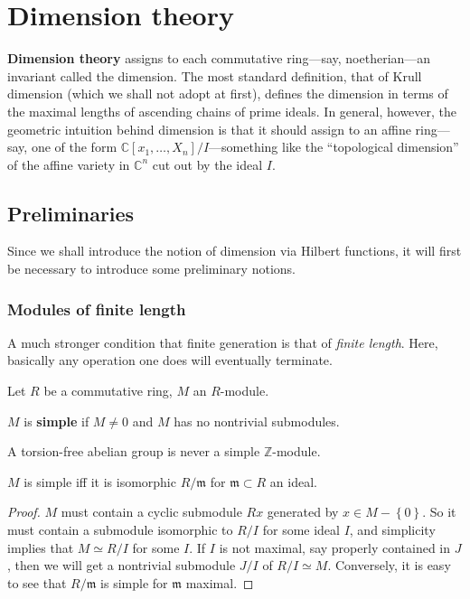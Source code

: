 \chapter{Dimension theory}

\textbf{Dimension theory} assigns to each commutative ring---say,
noetherian---an invariant called the dimension. The most standard definition,
that of Krull dimension (which we shall not adopt at first), defines the
dimension in terms of the maximal lengths of ascending chains of prime ideals. 
In general, however, the geometric intuition behind dimension is that it
should assign to an affine ring---say, one of the form $\mathbb{C}[x_1, \dots,
X_n]/I$---something like the ``topological dimension'' of the affine variety
in $\mathbb{C}^n$ cut out by the ideal $I$. 

\section{Preliminaries}

Since we shall introduce the notion of dimension via Hilbert functions, it
will first be necessary to introduce some preliminary notions.

\subsection{Modules of finite length}

A much stronger condition that finite generation is that of \emph{finite
length}. Here, basically any operation one does will eventually terminate. 

Let $R$ be a commutative ring, $M$ an $R$-module. 

\begin{definition} 
$M$ is \textbf{simple} if $M \neq 0$ and $M$ has no nontrivial submodules.
\end{definition} 


\begin{exercise} 
A torsion-free abelian group is never a simple $\mathbb{Z}$-module.
\end{exercise} 

\begin{proposition} 
$M$ is simple iff it is isomorphic $R/\mathfrak{m}$ for $\mathfrak{m} \subset
R$ an ideal.
\end{proposition} 

\begin{proof} 
$M$ must contain a cyclic submodule $Rx$ generated by $x \in
M - \left\{0\right\}$. So it must contain a submodule isomorphic to $R/I$
for some ideal $I$, and
simplicity implies that $M \simeq R/I$ for some $I$. If $I$ is not maximal,
say properly contained in $J$,
then we will get a nontrivial submodule $J/I$ of $R/I \simeq M$. Conversely,
it is easy to see
that $R/\mathfrak{m}$ is simple for $\mathfrak{m}$ maximal.
\end{proof} 


